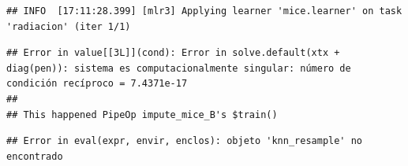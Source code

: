 \documentclass[
  11pt,
  a4paper,
]{article}
\newenvironment{Shaded}{\begin{snugshade}}{\end{snugshade}}
\newcommand{\AttributeTok}[1]{\textcolor[rgb]{0.77,0.63,0.00}{#1}}
\newcommand{\CommentTok}[1]{\textcolor[rgb]{0.56,0.35,0.01}{\textit{#1}}}
\newcommand{\DecValTok}[1]{\textcolor[rgb]{0.00,0.00,0.81}{#1}}
\newcommand{\FunctionTok}[1]{\textcolor[rgb]{0.00,0.00,0.00}{#1}}
\newcommand{\NormalTok}[1]{#1}
\newcommand{\OtherTok}[1]{\textcolor[rgb]{0.56,0.35,0.01}{#1}}
\newcommand{\SpecialCharTok}[1]{\textcolor[rgb]{0.00,0.00,0.00}{#1}}
\newcommand{\StringTok}[1]{\textcolor[rgb]{0.31,0.60,0.02}{#1}}
\begin{document}
\begin{Shaded}
\end{Shaded}

\begin{verbatim}
## INFO  [17:11:28.399] [mlr3] Applying learner 'mice.learner' on task 'radiacion' (iter 1/1)
\end{verbatim}

\begin{verbatim}
## Error in value[[3L]](cond): Error in solve.default(xtx + diag(pen)): sistema es computacionalmente singular: número de condición recíproco = 7.4371e-17
## 
## This happened PipeOp impute_mice_B's $train()
\end{verbatim}

\begin{Shaded}
\end{Shaded}

\begin{verbatim}
## Error in eval(expr, envir, enclos): objeto 'knn_resample' no encontrado
\end{verbatim}
\end{document}

